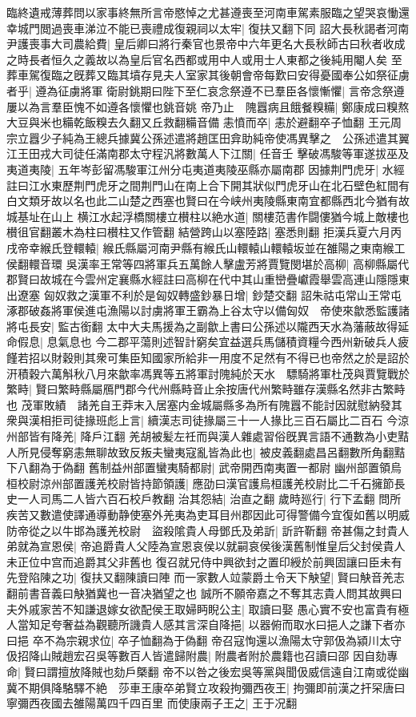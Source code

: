 臨終遺戒薄葬問以家事終無所言帝愍悼之尤甚遵喪至河南車駕素服臨之望哭哀慟還幸城門閲過喪車涕泣不能已喪禮成復親祠以太牢|{
	復扶又翻下同}
詔大長秋謁者河南尹護喪事大司農給費|{
	皇后卿曰將行秦官也景帝中六年更名大長秋師古曰秋者收成之時長者恒久之義故以為皇后官名西都或用中人或用士人東都之後純用閹人矣}
至葬車駕復臨之旣葬又臨其墳存見夫人室家其後朝會帝每歎曰安得憂國奉公如祭征虜者乎|{
	遵為征虜將軍}
衛尉銚期曰陛下至仁哀念祭遵不已羣臣各懷慚懼|{
	言帝念祭遵屢以為言羣臣愧不如遵各懷懼也銚音姚}
帝乃止　隗囂病且餓餐糗糒|{
	鄭康成曰糗熬大豆與米也糒乾飯糗去久翻又丘救翻糒音備}
恚憤而卒|{
	恚於避翻卒子恤翻}
王元周宗立囂少子純為王總兵據冀公孫述遣將趙匡田弇助純帝使馮異擊之　公孫述遣其翼江王田戎大司徒任滿南郡太守程汎將數萬人下江關|{
	任音壬}
擊破馮駿等軍遂拔巫及夷道夷陵|{
	五年岑彭留馮駿軍江州分屯夷道夷陵巫縣亦屬南郡}
因據荆門虎牙|{
	水經註曰江水東歷荆門虎牙之間荆門山在南上合下開其狀似門虎牙山在北石壁色紅間有白文類牙故以名也此二山楚之西塞也賢曰在今峡州夷陵縣東南宜都縣西北今猶有故城基址在山上}
横江水起浮橋關樓立櫕柱以絶水道|{
	關樓范書作闘僂猶今城上敵樓也櫕徂官翻叢木為柱曰櫕柱又作管翻}
結營跨山以塞陸路|{
	塞悉則翻}
拒漢兵夏六月丙戌帝幸緱氏登轘轅|{
	緱氏縣屬河南尹縣有緱氏山轘轅山轘轅坂並在雒陽之東南緱工侯翻轘音環}
吳漢率王常等四將軍兵五萬餘人擊盧芳將賈覽閔堪於高柳|{
	高柳縣屬代郡賢曰故城在今雲州定襄縣水經註曰高柳在代中其山重巒疊巘霞舉雲高連山隱隱東出遼塞}
匈奴救之漢軍不利於是匈奴轉盛鈔暴日增|{
	鈔楚交翻}
詔朱祜屯常山王常屯涿郡破姦將軍侯進屯漁陽以討虜將軍王霸為上谷太守以備匈奴　帝使來歙悉監護諸將屯長安|{
	監古銜翻}
太中大夫馬援為之副歙上書曰公孫述以隴西天水為藩蔽故得延命假息|{
	息氣息也}
今二郡平蕩則述智計窮矣宜益選兵馬儲積資糧今西州新破兵人疲饉若招以財穀則其衆可集臣知國家所給非一用度不足然有不得已也帝然之於是詔於汧積穀六萬斛秋八月來歙率馮異等五將軍討隗純於天水　驃騎將軍杜茂與賈覽戰於繁畤|{
	賢曰繁畤縣屬鴈門郡今代州縣畤音止余按唐代州繁畤雖存漢縣名然非古繁畤也}
茂軍敗績　諸羌自王莽末入居塞内金城屬縣多為所有隗囂不能討因就慰納發其衆與漢相拒司徒掾班彪上言|{
	續漢志司徒掾屬三十一人掾比三百石屬比二百石}
今涼州部皆有降羌|{
	降戶江翻}
羌胡被髪左祍而與漢人雜處習俗旣異言語不通數為小吏黠人所見侵奪窮恚無聊故致反叛夫蠻夷寇亂皆為此也|{
	被皮義翻處昌呂翻數所角翻黠下八翻為于偽翻}
舊制益州部置蠻夷騎都尉|{
	武帝開西南夷置一都尉}
幽州部置領烏桓校尉涼州部置護羌校尉皆持節領護|{
	應劭曰漢官護烏桓護羌校尉比二千石擁節長史一人司馬二人皆六百石校戶教翻}
治其怨結|{
	治直之翻}
歲時廵行|{
	行下孟翻}
問所疾苦又數遣使譯通導動静使塞外羌夷為吏耳目州郡因此可得警備今宜復如舊以明威防帝從之以牛邯為護羌校尉　盜殺隂貴人母鄧氏及弟訢|{
	訢許靳翻}
帝甚傷之封貴人弟就為宣恩侯|{
	帝追爵貴人父陸為宣恩哀侯以就嗣哀侯後漢舊制惟皇后父封侯貴人未正位中宫而追爵其父非舊也}
復召就兄侍中興欲封之置印綬於前興固讓曰臣未有先登陷陳之功|{
	復扶又翻陳讀曰陣}
而一家數人竝蒙爵土令天下觖望|{
	賢曰觖音羌志翻前書音義曰觖猶冀也一音决猶望之也}
誠所不願帝嘉之不奪其志貴人問其故興曰夫外戚家苦不知謙退嫁女欲配侯王取婦眄睨公主|{
	取讀曰娶}
愚心實不安也富貴有極人當知足夸奢益為觀聽所譏貴人感其言深自降挹|{
	以器俯而取水曰挹人之謙下者亦曰挹}
卒不為宗親求位|{
	卒子恤翻為于偽翻}
帝召寇恂還以漁陽太守郭伋為潁川太守伋招降山賊趙宏召吳等數百人皆遣歸附農|{
	附農者附於農籍也召讀曰邵}
因自劾專命|{
	賢曰謂擅放降賊也劾戶槩翻}
帝不以咎之後宏吳等黨與聞伋威信遠自江南或從幽冀不期俱降駱驛不絶　莎車王康卒弟賢立攻殺拘彌西夜王|{
	拘彌即前漢之扞罙唐曰寧彌西夜國去雒陽萬四千四百里}
而使康兩子王之|{
	王于况翻}


